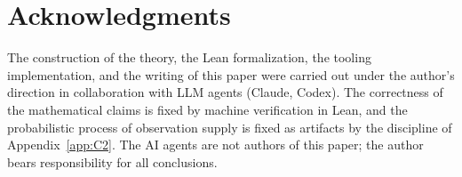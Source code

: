 \documentclass[11pt]{article}
\theoremstyle{plain}
\theoremstyle{definition}
\begin{document}











\section*{Acknowledgments}

The construction of the theory, the Lean formalization, the tooling
implementation, and the writing of this paper were carried out under the
author's direction in collaboration with LLM agents (Claude, Codex). The
correctness of the mathematical claims is fixed by machine verification in
Lean, and the probabilistic process of observation supply is fixed as
artifacts by the discipline of Appendix~\ref{app:C2}. The AI agents are not
authors of this paper; the author bears responsibility for all conclusions.





\end{document}
